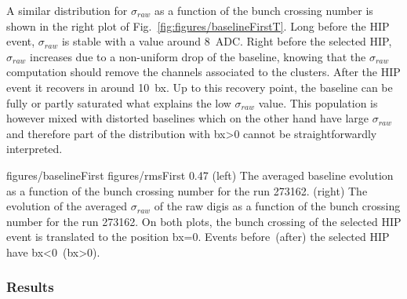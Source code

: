 A similar distribution for $\sigma_{raw}$  as a function of the bunch crossing number is shown in the right plot of Fig.~\ref{fig:figures/baselineFirstT}. Long before the HIP event, $\sigma_{raw}$ is stable with a value around 8~ADC. Right before the selected HIP, $\sigma_{raw}$ increases due to a non-uniform drop of the baseline, knowing that the $\sigma_{raw}$ computation should remove the channels associated to the clusters. After the HIP event it recovers in around 10~bx. Up to this recovery point, the baseline can be fully or partly saturated what explains the low $\sigma_{raw}$ value. This population is however mixed with distorted baselines which on the other hand have large $\sigma_{raw}$ and therefore part of the distribution with bx>0 cannot be straightforwardly interpreted.

                 {figures/baselineFirst} %
                 {figures/rmsFirst} %
                 {0.47}       %
                 {(left) The averaged baseline evolution as a function of the bunch crossing number for the run 273162.  (right) The evolution of the averaged $\sigma_{raw}$ of the raw digis as a function of the bunch crossing number for the  run 273162. On both plots, the bunch crossing of the selected HIP event is translated to the position bx=0. Events before~(after) the selected HIP have bx<0~(bx>0). } %

\subsubsection{Results}

